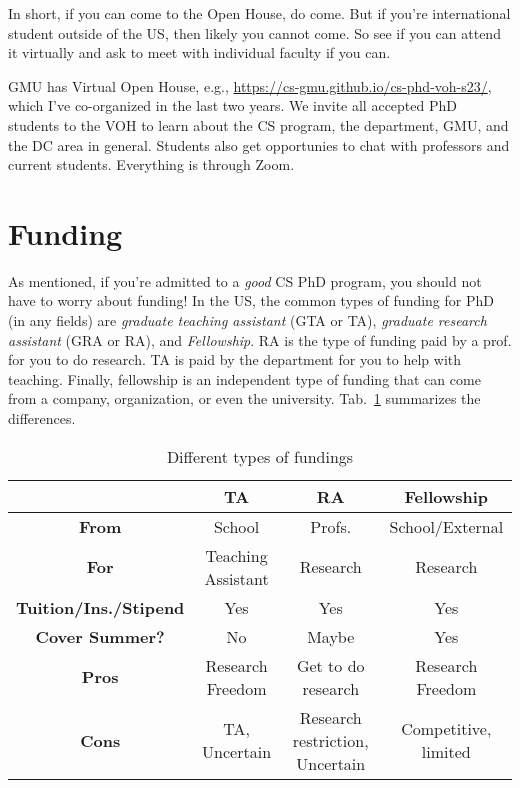 \documentclass[10pt]{article}
\begin{document}
In short, if you can come to the Open House, do come.  But if you're international student outside of the US, then likely you cannot come.  So see if you can attend it virtually and ask to meet with individual faculty if you can.

\begin{tcolorbox}[left=1pt,right=1pt,top=1pt,bottom=1pt]
GMU has Virtual Open House, e.g., \url{https://cs-gmu.github.io/cs-phd-voh-s23/}, which I've co-organized in the last two years. We invite all accepted PhD students to the VOH to learn about the CS program, the department, GMU, and the DC area in general. Students also get opportunies to chat with professors and current students.  Everything is through Zoom.
\end{tcolorbox}



\section{Funding}

As mentioned, if you're admitted to a \emph{good} CS PhD program, you should not have to worry about funding!  
In the US, the common types of funding for PhD (in any fields) are \emph{graduate teaching assistant} (GTA or TA), \emph{graduate research assistant} (GRA or RA), and \emph{Fellowship}.
RA is the type of funding paid by a prof. for you to do research. TA is paid by the department for you to help with teaching. Finally, fellowship is an independent type of funding that can come from a company, organization, or even the university.
Tab.~\ref{tab:funding} summarizes the differences.

\begin{table}
  \centering
  \caption{Different types of fundings}\label{tab:funding}
  \begin{tabular}{c|c|c|c}
    \toprule
    &\textbf{TA}&\textbf{RA}&\textbf{Fellowship}\\
    \midrule
    \textbf{From} & School & Profs. & School/External\\
    \textbf{For}                  & Teaching Assistant       & Research                        & Research                              \\
    \textbf{Tuition/Ins./Stipend} & Yes                      & Yes                             & Yes                                   \\
    \textbf{Cover Summer?}              & No                       & Maybe                           & Yes                                   \\
    \midrule
    \textbf{Pros}                 & Research Freedom         & Get to do research              & Research Freedom                      \\
    \textbf{Cons}                 & TA, Uncertain            & Research restriction, Uncertain & Competitive, limited             \\
    \bottomrule
  \end{tabular}
\end{table}
\end{document}
